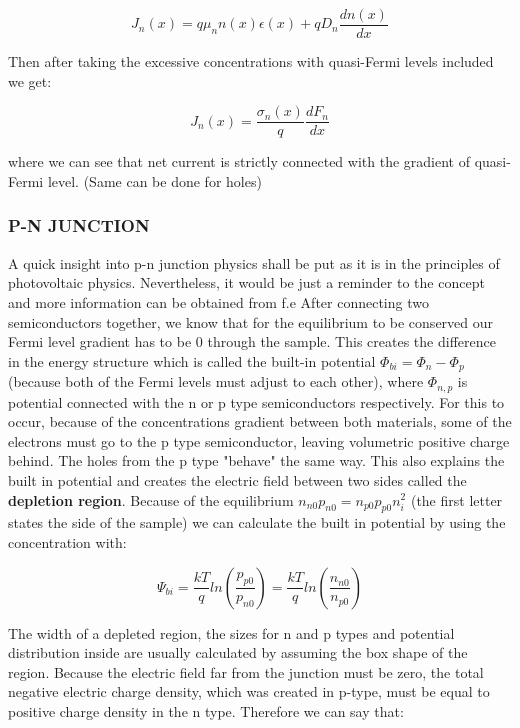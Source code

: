 \begin{equation}
J_n(x) = q\mu _n n(x)\epsilon (x)+ qD_n\frac{dn(x)}{dx}
\end{equation}

Then after taking the excessive concentrations with quasi-Fermi levels included we get:

\begin{equation}
J_n(x) = \frac{\sigma _n (x)}{q}\frac{dF_n}{dx}
\end{equation}

where we can see that net current is strictly connected with the gradient of quasi-Fermi level. (Same can be done for holes)

\subsubsection{P-N JUNCTION}
A quick insight into p-n junction physics shall be put as it is in the principles of photovoltaic physics. Nevertheless, it would be just a reminder to the concept and more information can be obtained from f.e \cite{sze}
After connecting two semiconductors together, we know that for the equilibrium to be conserved our Fermi level gradient has to be 0 through the sample. This creates the difference in the energy structure which is called the built-in  potential $\Phi _{bi} = \Phi _n - \Phi _p$(because both of the Fermi levels must adjust to each other), where $\Phi _{n,p}$ is potential connected with the n or p type semiconductors respectively. For this to occur, because of the concentrations gradient between both materials, some of the electrons must go to the p type semiconductor, leaving volumetric positive charge behind. The holes from the p type "behave" the same way. This also explains the built in potential and creates the electric field between two sides called the\textbf{ depletion region}. Because of the equilibrium $n_{n0}p_{n0}=n_{p0}p_{p0}n_i^2$ (the first letter states the side of the sample) we can calculate the built in potential by using the concentration with:

\begin{equation}
\Psi _{bi} = \frac{kT}{q}ln(\frac{p_{p0}}{p_{n0}})=\frac{kT}{q}ln(\frac{n_{n0}}{n_{p0}})
\end{equation}

The width of a depleted region, the sizes for n and p types and potential distribution inside are usually calculated by assuming the box shape of the region. Because the electric field far from the junction must be zero, the total negative electric charge density, which was created in p-type, must be equal to positive charge density in the n type. Therefore we can say that:

